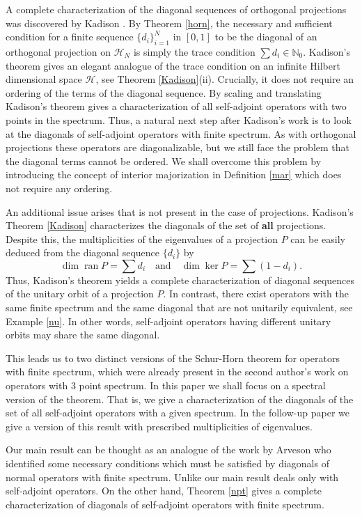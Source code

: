 \documentclass[12pt]{amsart}
\newcounter{Theorem}
\newcounter{Definition}
\numberwithin{equation}{section}
\numberwithin{Theorem}{section}
\theoremstyle{plain}
\theoremstyle{definition}
\theoremstyle{remark}
\begin{document}
A complete characterization of the diagonal sequences of orthogonal projections was discovered by Kadison \cite{k1,k2}. By Theorem \ref{horn}, the necessary and sufficient condition for a finite sequence $\{d_{i}\}_{i=1}^{N}$ in $[0,1]$ to be the diagonal of an orthogonal projection on $\mathcal H_N$ is simply the trace condition $\sum d_{i} \in{\mathbb{N}}_{0}$. Kadison's theorem gives an elegant analogue of the trace condition on an infinite Hilbert dimensional space $\mathcal H$, see Theorem \ref{Kadison}(ii). Crucially, it does not require an ordering of the terms of the diagonal sequence.
By scaling and translating Kadison's theorem gives a characterization of all self-adjoint operators with two points in the spectrum. Thus, a natural next step after Kadison's work is to look at the diagonals of self-adjoint operators with finite spectrum. As with orthogonal projections these operators are diagonalizable, but we still face the problem that the diagonal terms cannot be ordered. We shall overcome this problem by introducing the concept of interior majorization in Definition \ref{mar} which does not require any ordering.

An additional issue arises that is not present in the case of projections. Kadison's Theorem \ref{Kadison} characterizes the diagonals of the set of \textbf{all} projections. Despite this, the multiplicities of the eigenvalues of a projection $P$ can be easily deduced from the diagonal sequence $\{d_{i}\}$ by
\[\dim\operatorname{ran} P = \sum d_{i}\quad\text{and}\quad\dim\ker P = \sum(1-d_{i}).\]
Thus, Kadison's theorem yields a complete characterization of diagonal sequences of the unitary orbit of a projection $P$. In contrast, there exist operators with the same finite spectrum and the same diagonal that are not unitarily equivalent, see Example \ref{nu}. In other words, self-adjoint operators having different unitary orbits may share the same diagonal. 

This leads us to two distinct versions of the Schur-Horn theorem for operators with finite spectrum, which were already present in the second author's work \cite{jj} on operators with 3 point spectrum. In this paper we shall focus on a spectral version of the theorem. That is, we give a characterization of the diagonals of the set of all self-adjoint operators with a given spectrum. In the follow-up paper \cite{mbjj3} we give a version of this result with prescribed multiplicities of eigenvalues.

Our main result can be thought as an analogue of the work by Arveson \cite{a} who identified some necessary conditions which must be satisfied by diagonals of normal operators with finite spectrum. Unlike \cite{a} our main result deals only with self-adjoint operators. On the other hand, Theorem \ref{npt} gives a complete characterization of diagonals of self-adjoint operators with finite spectrum.
\end{document}
